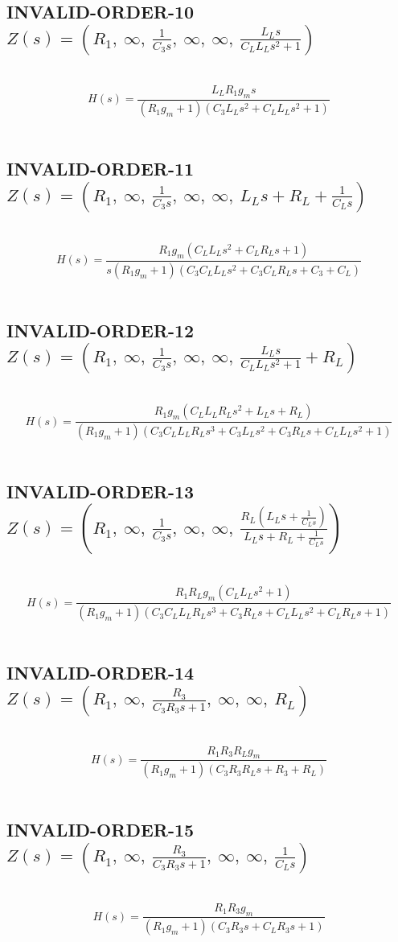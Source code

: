 \documentclass{article}
\begin{document}
\subsection{INVALID-ORDER-10 $Z(s) = \left( R_{1}, \  \infty, \  \frac{1}{C_{3} s}, \  \infty, \  \infty, \  \frac{L_{L} s}{C_{L} L_{L} s^{2} + 1}\right)$ } \ 
\textbf{\[H(s) = \frac{L_{L} R_{1} g_{m} s}{\left(R_{1} g_{m} + 1\right) \left(C_{3} L_{L} s^{2} + C_{L} L_{L} s^{2} + 1\right)}\] } \ 
\subsection{INVALID-ORDER-11 $Z(s) = \left( R_{1}, \  \infty, \  \frac{1}{C_{3} s}, \  \infty, \  \infty, \  L_{L} s + R_{L} + \frac{1}{C_{L} s}\right)$ } \ 
\textbf{\[H(s) = \frac{R_{1} g_{m} \left(C_{L} L_{L} s^{2} + C_{L} R_{L} s + 1\right)}{s \left(R_{1} g_{m} + 1\right) \left(C_{3} C_{L} L_{L} s^{2} + C_{3} C_{L} R_{L} s + C_{3} + C_{L}\right)}\] } \ 
\subsection{INVALID-ORDER-12 $Z(s) = \left( R_{1}, \  \infty, \  \frac{1}{C_{3} s}, \  \infty, \  \infty, \  \frac{L_{L} s}{C_{L} L_{L} s^{2} + 1} + R_{L}\right)$ } \ 
\textbf{\[H(s) = \frac{R_{1} g_{m} \left(C_{L} L_{L} R_{L} s^{2} + L_{L} s + R_{L}\right)}{\left(R_{1} g_{m} + 1\right) \left(C_{3} C_{L} L_{L} R_{L} s^{3} + C_{3} L_{L} s^{2} + C_{3} R_{L} s + C_{L} L_{L} s^{2} + 1\right)}\] } \ 
\subsection{INVALID-ORDER-13 $Z(s) = \left( R_{1}, \  \infty, \  \frac{1}{C_{3} s}, \  \infty, \  \infty, \  \frac{R_{L} \left(L_{L} s + \frac{1}{C_{L} s}\right)}{L_{L} s + R_{L} + \frac{1}{C_{L} s}}\right)$ } \ 
\textbf{\[H(s) = \frac{R_{1} R_{L} g_{m} \left(C_{L} L_{L} s^{2} + 1\right)}{\left(R_{1} g_{m} + 1\right) \left(C_{3} C_{L} L_{L} R_{L} s^{3} + C_{3} R_{L} s + C_{L} L_{L} s^{2} + C_{L} R_{L} s + 1\right)}\] } \ 
\subsection{INVALID-ORDER-14 $Z(s) = \left( R_{1}, \  \infty, \  \frac{R_{3}}{C_{3} R_{3} s + 1}, \  \infty, \  \infty, \  R_{L}\right)$ } \ 
\textbf{\[H(s) = \frac{R_{1} R_{3} R_{L} g_{m}}{\left(R_{1} g_{m} + 1\right) \left(C_{3} R_{3} R_{L} s + R_{3} + R_{L}\right)}\] } \ 
\subsection{INVALID-ORDER-15 $Z(s) = \left( R_{1}, \  \infty, \  \frac{R_{3}}{C_{3} R_{3} s + 1}, \  \infty, \  \infty, \  \frac{1}{C_{L} s}\right)$ } \ 
\textbf{\[H(s) = \frac{R_{1} R_{3} g_{m}}{\left(R_{1} g_{m} + 1\right) \left(C_{3} R_{3} s + C_{L} R_{3} s + 1\right)}\] } \ 
\end{document}
